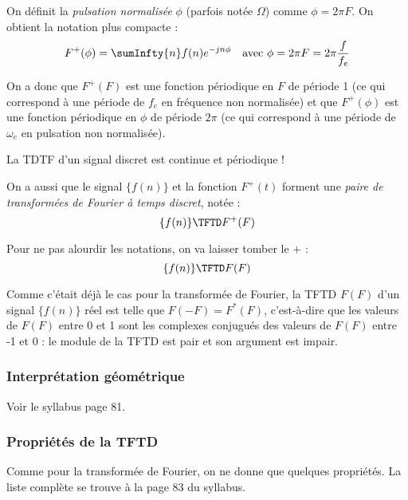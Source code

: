             On définit la \textit{pulsation normalisée} $\phi$ (parfois notée $\Omega$) comme $\phi = 2\pi F$. On obtient la notation plus compacte :
            \begin{align}
                &F^+(\phi) = \sumInfty{n} f(n)e^{-jn\phi} &\mbox{avec } \phi = 2\pi F = 2\pi \frac{f}{f_e}
                \label{eq:TFTDCompact}
            \end{align}

            On a donc que $F^+(F)$ est une fonction périodique en $F$ de période 1 (ce qui correspond à une période de $f_e$ en fréquence non normalisée) et que $F^+(\phi)$ est une fonction périodique en $\phi$ de période $2\pi$ (ce qui correspond à une période de $\omega_e$ en pulsation non normalisée).

            \begin{remarque}
                La TDTF d'un signal discret est continue et périodique !
            \end{remarque}

            On a aussi que le signal $\{f(n)\}$ et la fonction $F^+(t)$ forment une \textit{paire de transformées de Fourier à temps discret}, notée :
            $$
                \{f(n)\} \TFTD F^+(F)
            $$

            Pour ne pas alourdir les notations, on va laisser tomber le $+$ :
            $$
                \{f(n)\} \TFTD F(F)
            $$

            Comme c'était déjà le cas pour la transformée de Fourier, la TFTD $F(F)$ d'un signal $\{f(n)\}$ réel est telle que $F(-F) = F^*(F)$, c'est-à-dire que les valeurs de $F(F)$ entre 0 et 1 sont les complexes conjugués des valeurs de $F(F)$ entre -1 et 0 : le module de la TFTD est pair et son argument est impair.

            \subsubsection{Interprétation géométrique}
                Voir le syllabus page 81.

            \subsubsection{Propriétés de la TFTD}
                Comme pour la transformée de Fourier, on ne donne que quelques propriétés. La liste complète se trouve à la page 83 du syllabus.

